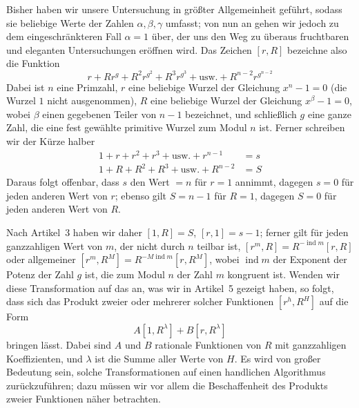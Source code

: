 Bisher haben wir unsere Untersuchung in größter Allgemeinheit geführt, sodass sie beliebige Werte der Zahlen $\alpha,\beta,\gamma$ umfasst; von nun an gehen wir jedoch zu dem eingeschränkteren Fall $\alpha=1$ über, der uns den Weg zu überaus fruchtbaren und eleganten Untersuchungen eröffnen wird. Das Zeichen $[r,R]$ bezeichne also die Funktion
\[
r+Rr^g+R^2r^{g^2}+R^3r^{g^3}+\text{usw.}+R^{n-2}r^{g^{n-2}}
\]
Dabei ist $n$ eine Primzahl, $r$ eine beliebige Wurzel der Gleichung $x^n-1=0$ (die Wurzel $1$ nicht ausgenommen), $R$ eine beliebige Wurzel der Gleichung $x^\beta-1=0$, wobei $\beta$ einen gegebenen Teiler von $n-1$ bezeichnet, und schließlich $g$ eine ganze Zahl, die eine fest gewählte primitive Wurzel zum Modul $n$ ist. Ferner schreiben wir der Kürze halber
\[
\begin{aligned}
1+r+r^2+r^3+\text{usw.}+r^{n-1}&=s\\
1+R+R^2+R^3+\text{usw.}+R^{n-2}&=S
\end{aligned}
\]
Daraus folgt offenbar, dass $s$ den Wert $=n$ für $r=1$ annimmt, dagegen $s=0$ für jeden anderen Wert von $r$; ebenso gilt $S=n-1$ für $R=1$, dagegen $S=0$ für jeden anderen Wert von $R$.

Nach Artikel~3 haben wir daher $[1,R]=S$, $[r,1]=s-1$; ferner gilt für jeden ganzzahligen Wert von $m$, der nicht durch $n$ teilbar ist, $[r^m,R]=R^{-\operatorname{ind}m}[r,R]$ oder allgemeiner $[r^m,R^M]=R^{-M\operatorname{ind}m}[r,R^M]$, wobei $\operatorname{ind}m$ der Exponent der Potenz der Zahl $g$ ist, die zum Modul $n$ der Zahl $m$ kongruent ist. Wenden wir diese Transformation auf das an, was wir in Artikel~5 gezeigt haben, so folgt, dass sich das Produkt zweier oder mehrerer solcher Funktionen $[r^h,R^H]$ auf die Form
\[
A[1,R^\lambda]+B[r,R^\lambda]
\]
bringen lässt. Dabei sind $A$ und $B$ rationale Funktionen von $R$ mit ganzzahligen Koeffizienten, und $\lambda$ ist die Summe aller Werte von $H$. Es wird von großer Bedeutung sein, solche Transformationen auf einen handlichen Algorithmus zurückzuführen; dazu müssen wir vor allem die Beschaffenheit des Produkts zweier Funktionen näher betrachten.

